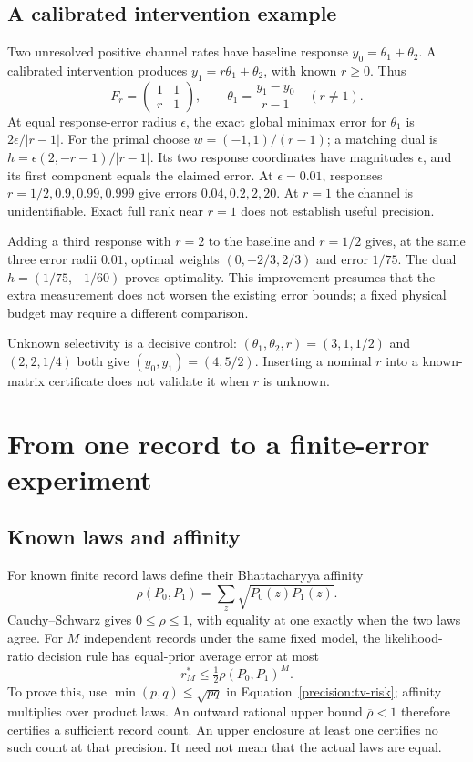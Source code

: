\subsection{A calibrated intervention example}

Two unresolved positive channel rates have baseline response
$y_0=\theta_1+\theta_2$. A calibrated intervention produces
$y_1=r\theta_1+\theta_2$, with known $r\geq0$. Thus
\[
 F_r=\begin{pmatrix}1&1\\r&1\end{pmatrix},\qquad
 \theta_1=\frac{y_1-y_0}{r-1}\quad(r\ne1).
\]
At equal response-error radius $\epsilon$, the exact global minimax error for
$\theta_1$ is $2\epsilon/|r-1|$. For the primal choose
$w=(-1,1)/(r-1)$; a matching dual is
$h=\epsilon(2,-r-1)/|r-1|$. Its two response coordinates have magnitudes
$\epsilon$, and its first component equals the claimed error.
At $\epsilon=0.01$, responses $r=1/2,0.9,0.99,0.999$ give errors
$0.04,0.2,2,20$. At $r=1$ the channel is unidentifiable. Exact full rank near
$r=1$ does not establish useful precision.

Adding a third response with $r=2$ to the baseline and $r=1/2$ gives, at the
same three error radii $0.01$, optimal weights $(0,-2/3,2/3)$ and error $1/75$.
The dual $h=(1/75,-1/60)$ proves optimality. This improvement presumes that
the extra measurement does not worsen the existing error bounds; a fixed
physical budget may require a different comparison.

Unknown selectivity is a decisive control: $(\theta_1,\theta_2,r)=(3,1,1/2)$
and $(2,2,1/4)$ both give $(y_0,y_1)=(4,5/2)$. Inserting a nominal $r$ into a
known-matrix certificate does not validate it when $r$ is unknown.

\section{From one record to a finite-error experiment}

\subsection{Known laws and affinity}

For known finite record laws define their Bhattacharyya affinity
\cite{caBhattacharyya1943}
\[
 \rho(P_0,P_1)=\sum_z\sqrt{P_0(z)P_1(z)}.
\]
Cauchy--Schwarz gives $0\leq\rho\leq1$, with equality at one exactly when the
two laws agree. For $M$ independent records under the same fixed model,
the likelihood-ratio decision rule has equal-prior average error at most
\begin{equation}
 r_M^*\leq\tfrac12\rho(P_0,P_1)^M.
 \label{precision:affinity}
\end{equation}
To prove this, use $\min(p,q)\leq\sqrt{pq}$ in
Equation~\eqref{precision:tv-risk}; affinity multiplies over product laws.
An outward rational upper bound $\overline\rho<1$ therefore certifies a
sufficient record count. An upper enclosure at least one certifies no such
count at that precision. It need not mean that the actual laws are equal.

